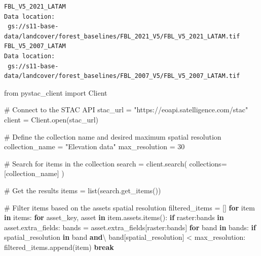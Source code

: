 \documentclass[
  oneside,
  open=any]{scrbook}
\newenvironment{Shaded}{\begin{snugshade}}{\end{snugshade}}
\newcommand{\BuiltInTok}[1]{\textcolor[rgb]{0.00,0.23,0.31}{#1}}
\newcommand{\CommentTok}[1]{\textcolor[rgb]{0.37,0.37,0.37}{#1}}
\newcommand{\ControlFlowTok}[1]{\textcolor[rgb]{0.00,0.23,0.31}{\textbf{#1}}}
\newcommand{\DecValTok}[1]{\textcolor[rgb]{0.68,0.00,0.00}{#1}}
\newcommand{\ImportTok}[1]{\textcolor[rgb]{0.00,0.46,0.62}{#1}}
\newcommand{\KeywordTok}[1]{\textcolor[rgb]{0.00,0.23,0.31}{\textbf{#1}}}
\newcommand{\NormalTok}[1]{\textcolor[rgb]{0.00,0.23,0.31}{#1}}
\newcommand{\OperatorTok}[1]{\textcolor[rgb]{0.37,0.37,0.37}{#1}}
\newcommand{\StringTok}[1]{\textcolor[rgb]{0.13,0.47,0.30}{#1}}
\begin{document}
\begin{verbatim}
FBL_V5_2021_LATAM 
Data location:
 gs://s11-base-data/landcover/forest_baselines/FBL_2021_V5/FBL_V5_2021_LATAM.tif
FBL_V5_2007_LATAM 
Data location:
 gs://s11-base-data/landcover/forest_baselines/FBL_2007_V5/FBL_V5_2007_LATAM.tif
\end{verbatim}

\begin{Shaded}
\begin{Highlighting}[]
\ImportTok{from}\NormalTok{ pystac\_client }\ImportTok{import}\NormalTok{ Client}

\CommentTok{\# Connect to the STAC API}
\NormalTok{stac\_url }\OperatorTok{=} \StringTok{"https://eoapi.satelligence.com/stac"}
\NormalTok{client }\OperatorTok{=}\NormalTok{ Client.}\BuiltInTok{open}\NormalTok{(stac\_url)}

\CommentTok{\# Define the collection name and desired maximum spatial resolution }
\NormalTok{collection\_name }\OperatorTok{=} \StringTok{"Elevation data"}
\NormalTok{max\_resolution }\OperatorTok{=} \DecValTok{30}

\CommentTok{\# Search for items in the collection}
\NormalTok{search }\OperatorTok{=}\NormalTok{ client.search(}
\NormalTok{    collections}\OperatorTok{=}\NormalTok{[collection\_name]}
\NormalTok{)}

\CommentTok{\# Get the results}
\NormalTok{items }\OperatorTok{=} \BuiltInTok{list}\NormalTok{(search.get\_items())}

\CommentTok{\# Filter items based on the asset\textquotesingle{}s spatial resolution}
\NormalTok{filtered\_items }\OperatorTok{=}\NormalTok{ []}
\ControlFlowTok{for}\NormalTok{ item }\KeywordTok{in}\NormalTok{ items:}
    \ControlFlowTok{for}\NormalTok{ asset\_key, asset }\KeywordTok{in}\NormalTok{ item.assets.items():}
        \ControlFlowTok{if} \StringTok{\textquotesingle{}raster:bands\textquotesingle{}} \KeywordTok{in}\NormalTok{ asset.extra\_fields:}
\NormalTok{            bands }\OperatorTok{=}\NormalTok{ asset.extra\_fields[}\StringTok{\textquotesingle{}raster:bands\textquotesingle{}}\NormalTok{]}
            \ControlFlowTok{for}\NormalTok{ band }\KeywordTok{in}\NormalTok{ bands:}
                \ControlFlowTok{if} \StringTok{\textquotesingle{}spatial\_resolution\textquotesingle{}} \KeywordTok{in}\NormalTok{ band }\KeywordTok{and}\OperatorTok{\textbackslash{}}
\NormalTok{                    band[}\StringTok{\textquotesingle{}spatial\_resolution\textquotesingle{}}\NormalTok{] }\OperatorTok{\textless{}}\NormalTok{ max\_resolution:}
\NormalTok{                    filtered\_items.append(item)}
                    \ControlFlowTok{break} 


\end{Highlighting}
\end{Shaded}
\end{document}
